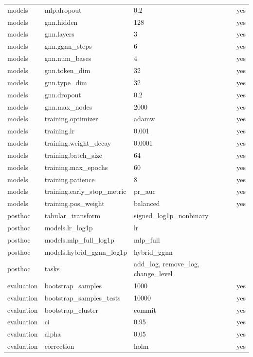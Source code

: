 {\begin{longtable}{llll}
models & mlp.dropout & 0.2 & yes \\
models & gnn.hidden & 128 & yes \\
models & gnn.layers & 3 & yes \\
models & gnn.ggnn\_steps & 6 & yes \\
models & gnn.num\_bases & 4 & yes \\
models & gnn.token\_dim & 32 & yes \\
models & gnn.type\_dim & 32 & yes \\
models & gnn.dropout & 0.2 & yes \\
models & gnn.max\_nodes & 2000 & yes \\
models & training.optimizer & adamw & yes \\
models & training.lr & 0.001 & yes \\
models & training.weight\_decay & 0.0001 & yes \\
models & training.batch\_size & 64 & yes \\
models & training.max\_epochs & 60 & yes \\
models & training.patience & 8 & yes \\
models & training.early\_stop\_metric & pr\_auc & yes \\
models & training.pos\_weight & balanced & yes \\
posthoc & tabular\_transform & signed\_log1p\_nonbinary &  \\
posthoc & models.lr\_log1p & lr &  \\
posthoc & models.mlp\_full\_log1p & mlp\_full &  \\
posthoc & models.hybrid\_ggnn\_log1p & hybrid\_ggnn &  \\
posthoc & tasks & add\_log, remove\_log, change\_level &  \\
evaluation & bootstrap\_samples & 1000 & yes \\
evaluation & bootstrap\_samples\_tests & 10000 & yes \\
evaluation & bootstrap\_cluster & commit & yes \\
evaluation & ci & 0.95 & yes \\
evaluation & alpha & 0.05 & yes \\
evaluation & correction & holm & yes \\
\end{longtable}
}
